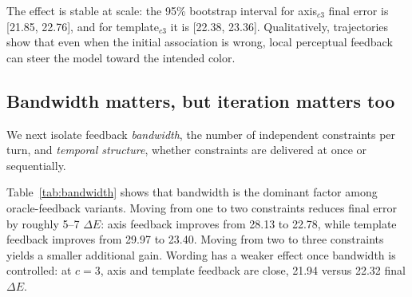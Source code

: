 \documentclass[11pt]{article}
\begin{document}
The effect is stable at scale: the 95\% bootstrap interval for axis$_{c3}$
final error is [21.85, 22.76], and for template$_{c3}$ it is [22.38, 23.36].
Qualitatively, trajectories show that even when the initial association is
wrong, local perceptual feedback can steer the model toward the intended
color.

\subsection{Bandwidth matters, but iteration matters too}
\label{sec:results_bandwidth_budget}

We next isolate feedback \emph{bandwidth}, the number of independent
constraints per turn, and \emph{temporal structure}, whether constraints are
delivered at once or sequentially.

\begin{table}[t]
\centering
\small
{}
\caption{Bandwidth ablation on \texttt{main\_4000}. Increasing feedback
from one to two constraints gives the largest gain; axis and template
wording are similar at matched bandwidth.}
\label{tab:bandwidth}
\end{table}

Table~\ref{tab:bandwidth} shows that bandwidth is the dominant factor among
oracle-feedback variants. Moving from one to two constraints reduces final
error by roughly 5--7 $\Delta E$: axis feedback improves from 28.13 to
22.78, while template feedback improves from 29.97 to 23.40. Moving from two
to three constraints yields a smaller additional gain. Wording has a weaker
effect once bandwidth is controlled: at $c=3$, axis and template feedback
are close, 21.94 versus 22.32 final $\Delta E$.
\end{document}
